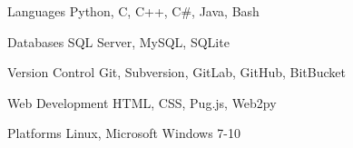 

\begin{cvskills}

  \cvskill
    {Languages} %
    {Python, C,  C++, C\#, Java, Bash} %

  \cvskill
    {Databases} %
    {SQL Server, MySQL, SQLite} %

  \cvskill
    {Version Control} %
    {Git, Subversion, GitLab, GitHub, BitBucket} %

  \cvskill
    {Web Development} %
    {HTML, CSS, Pug.js, Web2py} %

  \cvskill
    {Platforms} %
    {Linux, Microsoft Windows 7-10} %

\end{cvskills}
